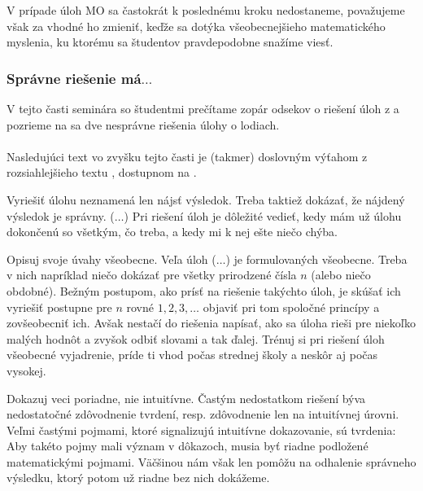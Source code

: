 {V prípade úloh MO sa častokrát k poslednému kroku nedostaneme, považujeme však za vhodné ho zmieniť, keďže sa dotýka všeobecnejšieho matematického myslenia, ku ktorému sa študentov pravdepodobne snažíme viesť.

\subsubsection*{Správne riešenie má$\ldots$}

V tejto časti seminára so študentmi prečítame zopár odsekov o riešení úloh z \cite{kms} a pozrieme na sa dve nesprávne riešenia úlohy o lodiach. \\
\\
Nasledujúci text vo zvyšku tejto časti je (takmer) doslovným výťahom z rozsiahlejšieho textu , dostupnom na \cite{kms}.

Vyriešiť úlohu neznamená len nájsť výsledok. Treba taktiež dokázať, že nájdený výsledok je správny. ($\ldots$) Pri riešení úloh je dôležité vedieť, kedy mám už úlohu dokončenú so všetkým, čo treba, a kedy mi k nej ešte niečo chýba. 

Opisuj svoje úvahy všeobecne. Veľa úloh ($\ldots$) je formulovaných všeobecne. Treba v nich napríklad niečo dokázať pre všetky prirodzené čísla $n$ (alebo niečo obdobné). Bežným postupom, ako prísť na riešenie takýchto úloh, je skúšať ich vyriešiť postupne pre $n$ rovné $1, 2, 3, \ldots$ objaviť pri tom spoločné princípy a zovšeobecniť ich. Avšak nestačí do riešenia napísať, ako sa úloha rieši pre niekoľko malých hodnôt a zvyšok odbiť slovami a tak ďalej. Trénuj si pri riešení úloh všeobecné vyjadrenie, príde ti vhod počas strednej školy a neskôr aj počas vysokej.

Dokazuj veci poriadne, nie intuitívne. Častým nedostatkom riešení býva nedostatočné zdôvodnenie tvrdení, resp. zdôvodnenie len na intuitívnej úrovni. Veľmi častými pojmami, ktoré signalizujú intuitívne dokazovanie, sú tvrdenia:    Aby takéto pojmy mali význam v dôkazoch, musia byť riadne podložené matematickými pojmami. Väčšinou nám však len pomôžu na odhalenie správneho výsledku, ktorý potom už riadne bez nich dokážeme.

}
